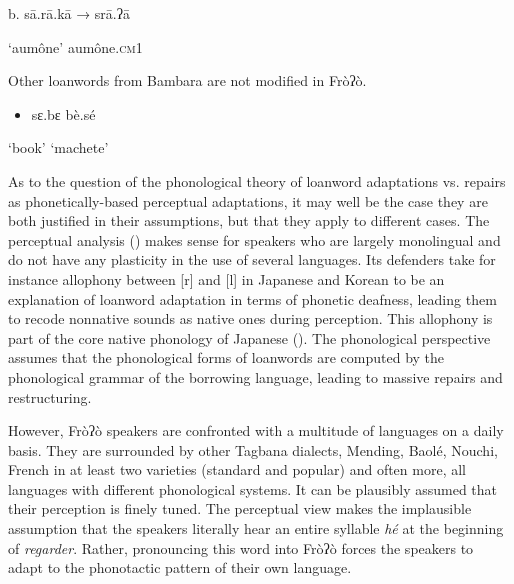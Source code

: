 \begin{styleindexi}
          b.       sā.rā.kā            →           srā.ʔā
\end{styleindexi}

\begin{styleindexi}
                     ‘aumône’                      aumône.\textsc{cm}1
\end{styleindexi}

Other loanwords from Bambara are not modified in Fròʔò.      

\begin{itemize}
\item \begin{styleindexi}
   sɛ.bɛ                bè.sé    
\end{styleindexi}\end{itemize}
\begin{styleindexi}
          ‘book’               ‘machete’ 
\end{styleindexi}

As to the question of the phonological theory of loanword adaptations vs. repairs as phonetically{}-based perceptual adaptations, it may well be the case they are both justified in their assumptions, but that they apply to different cases. The perceptual analysis (\citealt{PeperkampDupoux2003}) makes sense for speakers who are largely monolingual and do not have any plasticity in the use of several languages. Its defenders take for instance allophony between [r] and [l] in Japanese and Korean to be an explanation of loanword adaptation in terms of phonetic deafness, leading them to recode nonnative sounds as native ones during perception. This allophony is part of the core native phonology of Japanese (\citealt{ItoMester1995}). The phonological perspective assumes that the phonological forms of loanwords are computed by the phonological grammar of the borrowing language, leading to massive repairs and restructuring. 

However, Fròʔò speakers are confronted with a multitude of languages on a daily basis. They are surrounded by other Tagbana dialects, Mending, Baolé, Nouchi, French in at least two varieties (standard and popular) and often more, all languages with different phonological systems. It can be plausibly assumed that their perception is finely tuned. The perceptual view makes the implausible assumption that the speakers literally hear an entire syllable \textit{hé} at the beginning of \textit{regarder}. Rather, pronouncing this word into Fròʔò forces the speakers to adapt to the phonotactic pattern of their own language.

